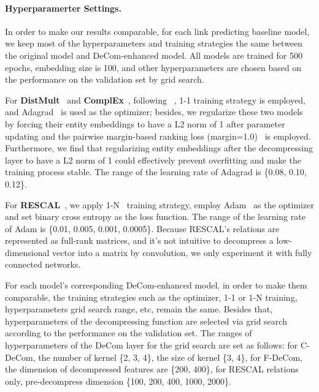 \documentclass[letterpaper]{article} \usepackage{aaai20}  \usepackage{times}  \usepackage{helvet} \usepackage{courier}  \usepackage{booktabs}
\begin{document}
\paragraph{Hyperparamerter Settings.}
In order to make our results comparable, for each link predicting baseline model, we keep most of the hyperparameters and training strategies the same between the original model and DeCom-enhanced model. All models are trained for 500 epochs, embedding size is 100, and other hyperparameters are chosen based on the performance on the validation set by grid search.

For \textbf{DistMult}~\cite{yang2014embedding} and \textbf{ComplEx}~\cite{trouillon2016complex}, following \citeauthor{dettmers2018convolutional}~, 1-1 training strategy is employed, and Adagrad~\cite{duchi2011adaptive} is used as the optimizer; besides, we regularize these two models by forcing their entity embeddings to have a L2 norm of 1 after parameter updating and the pairwise margin-based ranking loss (margin=1.0)~\cite{bordes2013translating} is employed. Furthermore, we find that regularizing entity embeddings after the decompressing layer to have a L2 norm of 1 could effectively prevent overfitting and make the training process stable. The range of the learning rate of Adagrad is \{0.08, 0.10, 0.12\}.


For \textbf{RESCAL}~\cite{nickel2011three}, we apply 1-N~\cite{dettmers2018convolutional} training strategy, employ Adam~\cite{kingma2014adam} as the optimizer and set binary cross entropy as the loss function. The range of the learning rate of Adam is \{0.01, 0.005, 0.001, 0.0005\}. Because RESCAL's relations are represented as full-rank matrices, and it's not intuitive to decompress a low-dimensional vector into a matrix by convolution, we only experiment it with fully connected networks.

For each model's corresponding DeCom-enhanced model, in order to make them comparable, the training strategies such as the optimizer, 1-1 or 1-N training, hyperparameters grid search range, etc, remain the same. Besides that, hyperparameters of the decompressing function are selected via grid search according to the performance on the validation set. The ranges of hyperparameters of the DeCom layer for the grid search are
set as follows: for C-DeCom, the number of kernel \{2, 3, 4\}, the size of kernel \{3, 4\}, for F-DeCom, the dimension of decompressed features are \{200, 400\}, for RESCAL relations only, pre-decompress dimension  \{100, 200, 400, 1000, 2000\}. 
\end{document}
